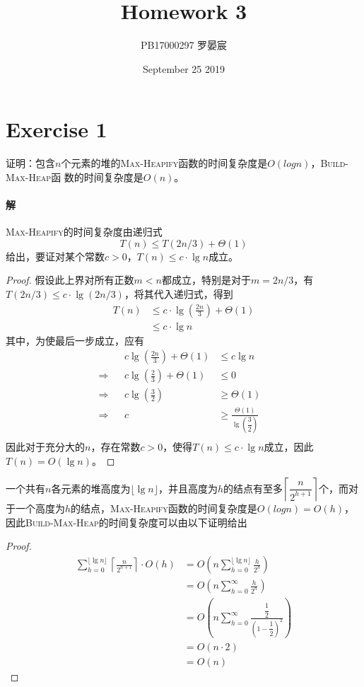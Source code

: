 \documentclass{article}
\title{Homework 3}
\author{PB17000297 罗晏宸}
\date{September 25 2019}
\begin{document}
\maketitle

\section{Exercise 1}
证明：包含$n$个元素的堆的\textsc{Max-Heapify}函数的时间复杂度是$O(logn)$，\textsc{Build-Max-Heap}函
数的时间复杂度是$O(n)$。
\\

\paragraph{解}
\textsc{Max-Heapify}的时间复杂度由递归式
\begin{equation*}
    T(n) \leq T(2n/3) + \Theta(1)
\end{equation*}
给出，要证对某个常数$c > 0$，$T(n) \leq c \cdot \lg{n}$成立。
\begin{proof}
假设此上界对所有正数$m < n$都成立，特别是对于$m =  2n/3$，有$T( 2n/3 ) \leq c \cdot \lg{(2n/3)}$，将其代入递归式，得到
\begin{align*}
    T(n) &\leq c \cdot \lg{\left(\frac{2n}{3}\right)} + \Theta(1) \\
    &\leq c \cdot \lg{n}
\end{align*}
其中，为使最后一步成立，应有
\begin{align*}
    && c \lg{\left(\frac{2n}{3}\right)} + \Theta(1) &\leq c \lg{n}& \\
    \Rightarrow && c \lg{\left( \frac{2}{3} \right)} + \Theta(1) &\leq 0 & \\
    \Rightarrow && c \lg{\left( \frac{3}{2} \right)} &\geq \Theta(1) & \\
    \Rightarrow && c &\geq \frac{\Theta(1)}{\lg{\left( \dfrac{3}{2} \right)}}& \\
\end{align*}
因此对于充分大的$n$，存在常数$c > 0$，使得$T(n) \leq c \cdot \lg{n}$成立，因此$T(n) = O(\lg{n})$。
\end{proof}
一个共有$n$各元素的堆高度为$\lfloor \lg{n} \rfloor$，并且高度为$h$的结点有至多$\left\lceil \dfrac{n}{2^{h+1}} \right\rceil$个，而对于一个高度为$h$的结点，\textsc{Max-Heapify}函数的时间复杂度是$O(logn)=O(h)$，因此\textsc{Build-Max-Heap}的时间复杂度可以由以下证明给出
\begin{proof}
\begin{align*}
    \sum_{h=0}^{\lfloor \lg{n} \rfloor}{\left\lceil \frac{n}{2^{h+1}} \right\rceil \cdot O(h)} &= O\left( n\sum_{h=0}^{\lfloor \lg{n} \rfloor}{\frac{h}{2^h}} \right) \\
    &= O\left( n\sum_{h=0}^{\infty}{\frac{h}{2^h}} \right) \\
    &= O\left( n\sum_{h=0}^{\infty}{\frac{\dfrac{1}{2}}{\left( 1 - \dfrac{1}{2} \right)^2}} \right) \\
    &= O(n \cdot 2) \\
    &= O(n)
\end{align*}
\end{proof}
\end{document}
